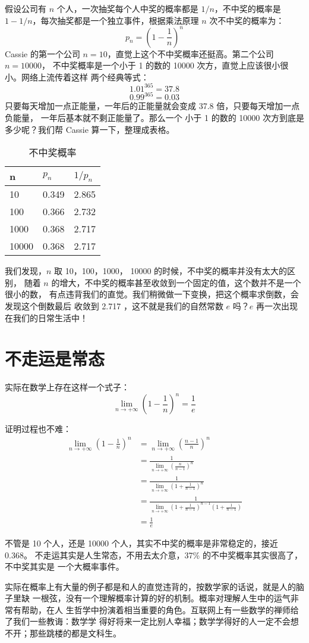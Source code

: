 假设公司有 $n$ 个人，一次抽奖每个人中奖的概率都是 $1/n$，不中奖的概率是
$1-1/n$，每次抽奖都是一个独立事件，根据乘法原理 $n$ 次不中奖的概率为：
 $$ p_n = (1- \frac1n)^n $$
Cassie 的第一个公司 $n=10$，直觉上这个不中奖概率还挺高。第二个公司$ n=10000$，
不中奖概率是一个小于 1 的数的 10000 次方，直觉上应该很小很小。网络上流传着这样
两个经典等式：
$$ 1.01^{365} = 37.8 $$
$$ 0.99^{365} = 0.03 $$
只要每天增加一点正能量，一年后的正能量就会变成 37.8 倍，只要每天增加一点负能量，
一年后基本就不剩正能量了。那么一个 小于 1 的数的 10000 次方到底是多少呢？我们帮
 Cassie 算一下，整理成表格。

\begin{table}[htbp]
\centering
\caption{不中奖概率}
\begin{tabular}{|l|l|l|}
\hline
     n     & $ p_n $ & $ 1/p_n $ \\ \hline
     10    & 0.349   & 2.865     \\ \hline
     100   & 0.366   & 2.732     \\ \hline
     1000  & 0.368   & 2.717     \\ \hline
     10000 & 0.368   & 2.717     \\ \hline
\end{tabular}
\end{table}

我们发现，$n$ 取 10，100，1000， 10000 的时候，不中奖的概率并没有太大的区别，
随着 $n$ 的增大，不中奖的概率甚至收敛到一个固定的值，这个数并不是一个很小的数，
有点违背我们的直觉。我们稍微做一下变换，把这个概率求倒数，会发现这个倒数最后
收敛到 2.717 ，这不就是我们的自然常数 $e$ 吗？$e$ 再一次出现在我们的日常生活中！

\section{不走运是常态}

实际在数学上存在这样一个式子：
$$ \lim_{n \rightarrow +\infty } (1 - \frac1n)^n = \frac1e $$

证明过程也不难：
\begin{align*}
\lim_{n \rightarrow +\infty } (1 - \frac1n)^n & = \lim_{n \rightarrow +\infty } (\frac {n-1} {n})^n   \\
&=  \frac {1} {\lim_{n \rightarrow +\infty } (\frac {n} {n-1})^n} \\
&=  \frac {1} {\lim_{n \rightarrow +\infty } ( 1 + \frac {1}{n-1})^n}  \\
&=  \frac {1} {\lim_{n \rightarrow +\infty } ( 1 + \frac {1}{n-1})^{n-1} (1+\frac {1} {n-1})} \\
&= \frac1e
\end{align*}

不管是 10 个人，还是 10000 个人，其实不中奖的概率是非常稳定的，接近 0.368。
不走运其实是人生常态，不用去太介意，37\% 的不中奖概率其实很高了，不中奖其实是
一个大概率事件。

实际在概率上有大量的例子都是和人的直觉违背的，按数学家的话说，就是人的脑子里缺
一根弦，没有一个理解概率计算的好的机制。概率对理解人生中的运气非常有帮助，在人
生哲学中扮演着相当重要的角色。互联网上有一些数学的禅师给了我们一些教诲：数学学
得好将来一定比别人幸福；数学学得好的人一定不会想不开；那些跳楼的都是文科生。
